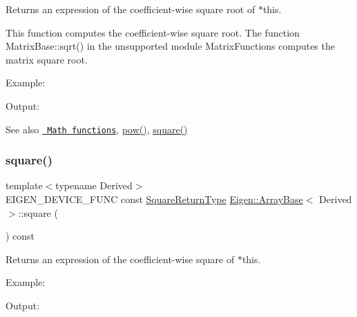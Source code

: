 \begin{DoxyReturn}{Returns}
an expression of the coefficient-\/wise square root of $\ast$this.
\end{DoxyReturn}
This function computes the coefficient-\/wise square root. The function Matrix\+Base\+::sqrt() in the unsupported module Matrix\+Functions computes the matrix square root.

Example\+: 
\begin{DoxyCodeInclude}{0}
\end{DoxyCodeInclude}
 Output\+: 
\begin{DoxyVerbInclude}
\end{DoxyVerbInclude}


\begin{DoxySeeAlso}{See also}
\href{group__CoeffwiseMathFunctions.html\#cwisetable_sqrt}{\texttt{ Math functions}}, \mbox{\hyperlink{class_eigen_1_1_array_base_ab6dc101d82e8228a19a8840e3a29c1c9}{pow()}}, \mbox{\hyperlink{class_eigen_1_1_array_base_a95c818b933d73944c53bf0226ea106c8}{square()}} 
\end{DoxySeeAlso}
\mbox{\label{class_eigen_1_1_array_base_a95c818b933d73944c53bf0226ea106c8}} 
\subsubsection{\texorpdfstring{square()}{square()}}
{\footnotesize\ttfamily template$<$typename Derived$>$ \\
E\+I\+G\+E\+N\+\_\+\+D\+E\+V\+I\+C\+E\+\_\+\+F\+U\+NC const \mbox{\hyperlink{class_eigen_1_1_cwise_unary_op}{Square\+Return\+Type}} \mbox{\hyperlink{class_eigen_1_1_array_base}{Eigen\+::\+Array\+Base}}$<$ Derived $>$\+::square (\begin{DoxyParamCaption}{ }\end{DoxyParamCaption}) const\hspace{0.3cm}{\ttfamily [inline]}}

\begin{DoxyReturn}{Returns}
an expression of the coefficient-\/wise square of $\ast$this.
\end{DoxyReturn}
Example\+: 
\begin{DoxyCodeInclude}{0}
\end{DoxyCodeInclude}
 Output\+: 
\begin{DoxyVerbInclude}
\end{DoxyVerbInclude}


